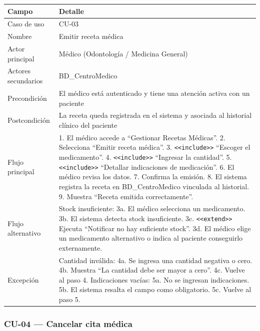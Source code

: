 \documentclass[11pt,a4paper]{article}
\begin{document}
	\begin{longtable}{p{} p{} }
		
		\toprule
		\textbf{Campo} &
		\textbf{Detalle}  \\
		\midrule
		\endhead
		
		
		Caso de uso & CU-03 \\
		Nombre & Emitir receta médica \\
		Actor principal & Médico (Odontología / Medicina General) \\
		Actores secundarios & BD\_CentroMedico \\
		Precondición & El médico está autenticado y tiene una atención activa con un paciente \\
		Postcondición & La receta queda registrada en el sistema y asociada al historial clínico del paciente \\
		Flujo principal & 1. El médico accede a ``Gestionar Recetas Médicas''. 2. Selecciona ``Emitir receta médica''. 3. \texttt{<<include>>} ``Escoger el medicamento''. 4. \texttt{<<include>>} ``Ingresar la cantidad''. 5. \texttt{<<include>>} ``Detallar indicaciones de medicación''. 6. El médico revisa los datos. 7. Confirma la emisión. 8. El sistema registra la receta en BD\_CentroMedico vinculada al historial. 9. Muestra ``Receta emitida correctamente''. \\
		Flujo alternativo & Stock insuficiente: 3a. El médico selecciona un medicamento. 3b. El sistema detecta stock insuficiente. 3c. \texttt{<<extend>>} Ejecuta ``Notificar no hay suficiente stock''. 3d. El médico elige un medicamento alternativo o indica al paciente conseguirlo externamente. \\
		Excepción & Cantidad inválida: 4a. Se ingresa una cantidad negativa o cero. 4b. Muestra ``La cantidad debe ser mayor a cero''. 4c. Vuelve al paso 4. Indicaciones vacías: 5a. No se ingresan indicaciones. 5b. El sistema resalta el campo como obligatorio. 5c. Vuelve al paso 5. \\
		
		\bottomrule
	\end{longtable}
	
	
	\subsubsection{CU-04 --- Cancelar cita médica}
	
\end{document}
